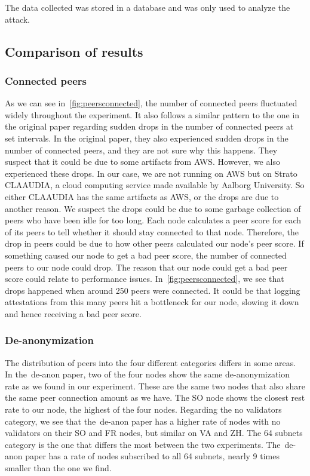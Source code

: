 The data collected was stored in a database and was only used to analyze the attack.

\subsection{Comparison of results}\label{subsec:res-comparison}

\subsubsection{Connected peers}\label{subsubsec:connected-peers}
As we can see in~\autoref{fig:peersconnected}, the number of connected peers fluctuated widely throughout the experiment.
It also follows a similar pattern to the one in the original paper regarding sudden drops in the number of connected peers at set intervals.
In the original paper, they also experienced sudden drops in the number of connected peers, and they are not sure why this happens.
They suspect that it could be due to some artifacts from AWS\@.
However, we also experienced these drops.
In our case, we are not running on AWS but on Strato CLAAUDIA, a cloud computing service made available by Aalborg University.
So either CLAAUDIA has the same artifacts as AWS, or the drops are due to another reason.
We suspect the drops could be due to some garbage collection of peers who have been idle for too long.
Each node calculates a peer score for each of its peers to tell whether it should stay connected to that node.
Therefore, the drop in peers could be due to how other peers calculated our node's peer score.
If something caused our node to get a bad peer score, the number of connected peers to our node could drop.
The reason that our node could get a bad peer score could relate to performance issues.
In~\autoref {fig:peersconnected}, we see that drops happened when around 250 peers were connected.
It could be that logging attestations from this many peers hit a bottleneck for our node, slowing it down and hence receiving a bad peer score.

\subsubsection{De-anonymization}\label{subsubsec:de-anonymization}
The distribution of peers into the four different categories differs in some areas.
In the~\gls{de-anon paper}, two of the four nodes show the same de-anonymization rate as we found in our experiment.
These are the same two nodes that also share the same peer connection amount as we have.
The SO node shows the closest rest rate to our node, the highest of the four nodes.
Regarding the no validators category, we see that the~\gls{de-anon paper} has a higher rate of nodes with no validators on their SO and FR nodes, but similar on VA and ZH.
The 64 subnets category is the one that differs the most between the two experiments.
The~\gls{de-anon paper} has a rate of nodes subscribed to all 64 subnets, nearly 9 times smaller than the one we find.


